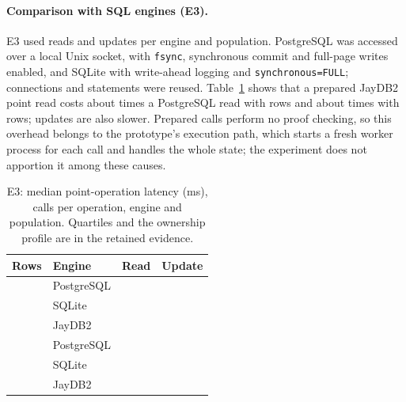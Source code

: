 \documentclass[12pt]{article}
\newcommand{\lat}[1]{\pgfmathprintnumber[fixed,fixed zerofill,precision=3,1000 sep={\mathord{,}}]{#1}}
\newcommand{\whole}[1]{\pgfmathprintnumber[fixed,precision=0,1000 sep={\mathord{,}}]{#1}}
\newcommand{\code}[1]{\texttt{#1}}
\begin{document}
\paragraph{Comparison with SQL engines (E3).}
E3 used \ComparisonSamples{} reads and updates per engine and population.
PostgreSQL was accessed over a local Unix socket, with \code{fsync}, synchronous
commit and full-page writes enabled, and SQLite with write-ahead logging and
\code{synchronous=FULL}; connections and statements were reused.
Table~\ref{tab:sql} shows that a prepared JayDB2 point read costs about
\whole{\JayPointReadOverPostgres} times a PostgreSQL read with
\ScalingSmallRows{} rows and about \whole{\LargeJayReadOverPostgres} times with
\ComparisonLargeRows{} rows; updates are also slower. Prepared calls perform no proof
checking, so this overhead belongs to the prototype's execution path, which
starts a fresh worker process for each call and handles the whole state; the
experiment does not apportion it among these causes.

\begin{table}[tb]\centering\small
\caption{E3: median point-operation latency (ms), \ComparisonSamples{} calls per
operation, engine and population. Quartiles and the ownership profile are in
the retained evidence.}
\label{tab:sql}
\begin{tabular}{@{}llrr@{}}\toprule Rows & Engine & Read & Update\\\midrule
\ScalingSmallRows{} & PostgreSQL & \lat{\PostgresPointReadMedianMs} & \lat{\PostgresPointUpdateMedianMs}\\
\ScalingSmallRows{} & SQLite & \lat{\SqlitePointReadMedianMs} & \lat{\SqlitePointUpdateMedianMs}\\
\ScalingSmallRows{} & JayDB2 & \lat{\JayPointReadMedianMs} & \lat{\JayPointUpdateMedianMs}\\\midrule
\ComparisonLargeRows{} & PostgreSQL & \lat{\LargePgReadMs} & \lat{\LargePgWriteMs}\\
\ComparisonLargeRows{} & SQLite & \lat{\LargeSqReadMs} & \lat{\LargeSqWriteMs}\\
\ComparisonLargeRows{} & JayDB2 & \lat{\LargeJayReadMs} & \lat{\LargeJayWriteMs}\\\bottomrule
\end{tabular}
\end{table}
\end{document}
